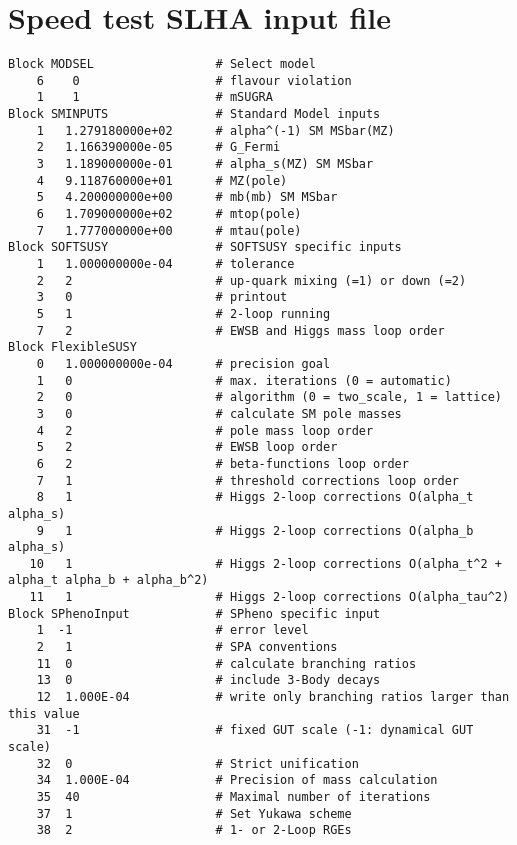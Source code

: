 \documentclass[final,3p,11pt,pdflatex]{elsarticle}
\begin{document}
\appendix

\section{Speed test SLHA input file}
\label{sec:speed-test-slha-template-file}
%
\begin{lstlisting}
Block MODSEL                 # Select model
    6    0                   # flavour violation
    1    1                   # mSUGRA
Block SMINPUTS               # Standard Model inputs
    1   1.279180000e+02      # alpha^(-1) SM MSbar(MZ)
    2   1.166390000e-05      # G_Fermi
    3   1.189000000e-01      # alpha_s(MZ) SM MSbar
    4   9.118760000e+01      # MZ(pole)
    5   4.200000000e+00      # mb(mb) SM MSbar
    6   1.709000000e+02      # mtop(pole)
    7   1.777000000e+00      # mtau(pole)
Block SOFTSUSY               # SOFTSUSY specific inputs
    1   1.000000000e-04      # tolerance
    2   2                    # up-quark mixing (=1) or down (=2)
    3   0                    # printout
    5   1                    # 2-loop running
    7   2                    # EWSB and Higgs mass loop order
Block FlexibleSUSY
    0   1.000000000e-04      # precision goal
    1   0                    # max. iterations (0 = automatic)
    2   0                    # algorithm (0 = two_scale, 1 = lattice)
    3   0                    # calculate SM pole masses
    4   2                    # pole mass loop order
    5   2                    # EWSB loop order
    6   2                    # beta-functions loop order
    7   1                    # threshold corrections loop order
    8   1                    # Higgs 2-loop corrections O(alpha_t alpha_s)
    9   1                    # Higgs 2-loop corrections O(alpha_b alpha_s)
   10   1                    # Higgs 2-loop corrections O(alpha_t^2 + alpha_t alpha_b + alpha_b^2)
   11   1                    # Higgs 2-loop corrections O(alpha_tau^2)
Block SPhenoInput            # SPheno specific input
    1  -1                    # error level
    2   1                    # SPA conventions
    11  0                    # calculate branching ratios
    13  0                    # include 3-Body decays
    12  1.000E-04            # write only branching ratios larger than this value
    31  -1                   # fixed GUT scale (-1: dynamical GUT scale)
    32  0                    # Strict unification
    34  1.000E-04            # Precision of mass calculation
    35  40                   # Maximal number of iterations
    37  1                    # Set Yukawa scheme
    38  2                    # 1- or 2-Loop RGEs

\end{lstlisting}
\end{document}

